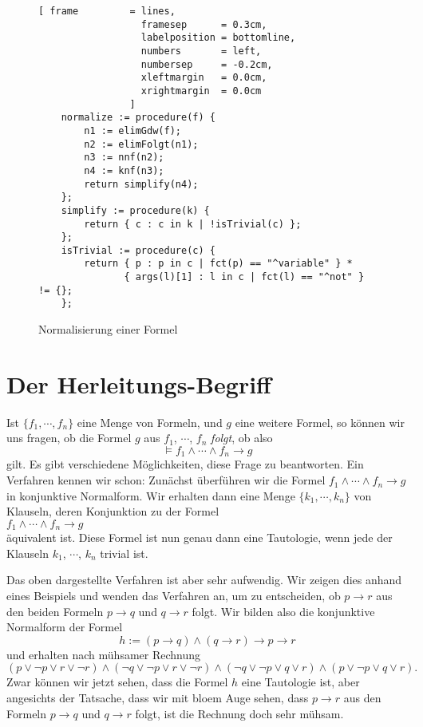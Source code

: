 \begin{figure}[!ht]
  \centering
\begin{Verbatim}[ frame         = lines, 
                  framesep      = 0.3cm, 
                  labelposition = bottomline,
                  numbers       = left,
                  numbersep     = -0.2cm,
                  xleftmargin   = 0.0cm,
                  xrightmargin  = 0.0cm
                ]
    normalize := procedure(f) {
        n1 := elimGdw(f);
        n2 := elimFolgt(n1);
        n3 := nnf(n2);
        n4 := knf(n3);
        return simplify(n4);
    };
    simplify := procedure(k) {
        return { c : c in k | !isTrivial(c) };
    };
    isTrivial := procedure(c) {
        return { p : p in c | fct(p) == "^variable" } * 
               { args(l)[1] : l in c | fct(l) == "^not" } != {};
    };
\end{Verbatim}
\vspace*{-0.3cm}
  \caption{Normalisierung einer Formel}
  \label{fig:normalize}
\end{figure}
\vspace*{\fill}



\section{Der Herleitungs-Begriff}
Ist $\{f_1,\cdots,f_n\}$ eine Menge von Formeln, und $g$ eine weitere Formel, so
k\"{o}nnen wir uns fragen, ob  die  Formel $g$ aus $f_1$, $\cdots$, $f_n$ \emph{folgt}, ob
also 
\[ \models f_1 \wedge \cdots \wedge f_n \rightarrow g \]
gilt.
Es gibt verschiedene M\"{o}glichkeiten, diese Frage zu beantworten.  Ein Verfahren kennen wir
schon: Zun\"{a}chst \"{u}berf\"{u}hren wir die Formel  $f_1 \wedge \cdots \wedge f_n \rightarrow g$ in
konjunktive Normalform.  Wir erhalten dann eine Menge
$\{k_1,\cdots,k_n\}$ von Klauseln, deren Konjunktion zu der  Formel
\\[0.2cm]
\hspace*{1.3cm} $f_1 \wedge \cdots \wedge f_n \rightarrow g$
\\[0.2cm] 
\"{a}quivalent ist.  Diese Formel ist nun genau dann eine Tautologie, wenn
jede der Klauseln $k_1$, $\cdots$, $k_n$ trivial ist.  

Das oben dargestellte Verfahren ist aber sehr aufwendig.  Wir zeigen dies anhand eines
Beispiels und wenden das Verfahren
an, um zu entscheiden, ob $p \rightarrow r$ aus den beiden Formeln $p \rightarrow q$ und
$q \rightarrow r$ folgt.   Wir bilden also die konjunktive Normalform der Formel 
\[ h := (p \rightarrow q) \wedge (q \rightarrow r) \rightarrow p \rightarrow r
\]
und erhalten nach m\"{u}hsamer Rechnung
\[
   (p \vee \neg p \vee r \vee \neg r) \wedge (\neg q \vee \neg p \vee r \vee \neg r) \wedge
   (\neg q \vee \neg p \vee q \vee r) \wedge (p \vee \neg p \vee q \vee r). 
\]
Zwar k\"{o}nnen wir jetzt sehen, dass die Formel $h$ eine Tautologie ist, aber angesichts der
Tatsache, dass wir mit blo\3em Auge sehen, dass  $p \rightarrow r$ aus den Formeln $p \rightarrow q$ und
$q \rightarrow r$ folgt, ist die Rechnung  doch  sehr m\"{u}hsam.

